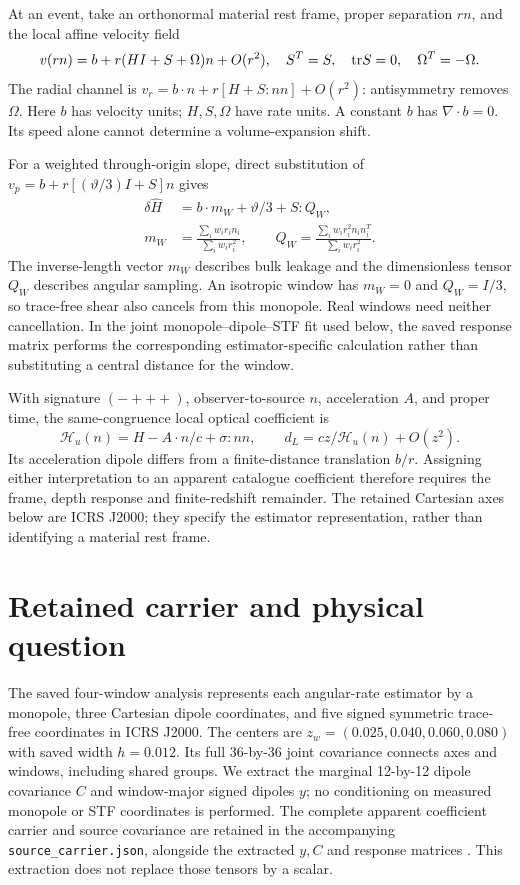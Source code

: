 \documentclass[aps,prd,reprint,onecolumn,superscriptaddress,nofootinbib]{revtex4-2}
\begin{document}
At an event, take an orthonormal material rest frame, proper separation $r n$, and the local affine velocity field
\begin{equation}
 v(rn)=b+r(HI+S+\Omega)n+O(r^2),\quad S^T=S,\quad {\rm tr}S=0,\quad\Omega^T=-\Omega.
\end{equation}
The radial channel is $v_r=b\cdot n+r[H+S:nn]+O(r^2)$: antisymmetry removes $\Omega$. Here $b$ has velocity units; $H,S,\Omega$ have rate units. A constant $b$ has $\nabla\cdot b=0$. Its speed alone cannot determine a volume-expansion shift.

For a weighted through-origin slope, direct substitution of $v_p=b+r[(\vartheta/3)I+S]n$ gives
\begin{align}
 \delta\widehat H&=b\cdot m_W+\vartheta/3+S:Q_W,\\
 m_W&=\frac{\sum_iw_ir_in_i}{\sum_iw_ir_i^2},\qquad
 Q_W=\frac{\sum_iw_ir_i^2n_in_i^T}{\sum_iw_ir_i^2}.
 \label{eq:window}
\end{align}
The inverse-length vector $m_W$ describes bulk leakage and the dimensionless tensor $Q_W$ describes angular sampling. An isotropic window has $m_W=0$ and $Q_W=I/3$, so trace-free shear also cancels from this monopole. Real windows need neither cancellation. In the joint monopole--dipole--STF fit used below, the saved response matrix performs the corresponding estimator-specific calculation rather than substituting a central distance for the window.

With signature $(-+++)$, observer-to-source $n$, acceleration $A$, and proper time, the same-congruence local optical coefficient is
\begin{equation}
 \mathcal H_u(n)=H-A\cdot n/c+\sigma:nn,\qquad d_L=cz/\mathcal H_u(n)+O(z^2).
\end{equation}
Its acceleration dipole differs from a finite-distance translation $b/r$. Assigning either interpretation to an apparent catalogue coefficient therefore requires the frame, depth response and finite-redshift remainder. The retained Cartesian axes below are ICRS J2000; they specify the estimator representation, rather than identifying a material rest frame.

\section{Retained carrier and physical question}

The saved four-window analysis represents each angular-rate estimator by a monopole, three Cartesian dipole coordinates, and five signed symmetric trace-free coordinates in ICRS J2000. The centers are $z_w=(0.025,0.040,0.060,0.080)$ with saved width $h=0.012$. Its full 36-by-36 joint covariance connects axes and windows, including shared groups. We extract the marginal 12-by-12 dipole covariance $C$ and window-major signed dipoles $y$; no conditioning on measured monopole or STF coordinates is performed. The complete apparent coefficient carrier and source covariance are retained in the accompanying \texttt{source\_carrier.json}, alongside the extracted $y,C$ and response matrices \cite{h03,physical}. This extraction does not replace those tensors by a scalar.
\end{document}
